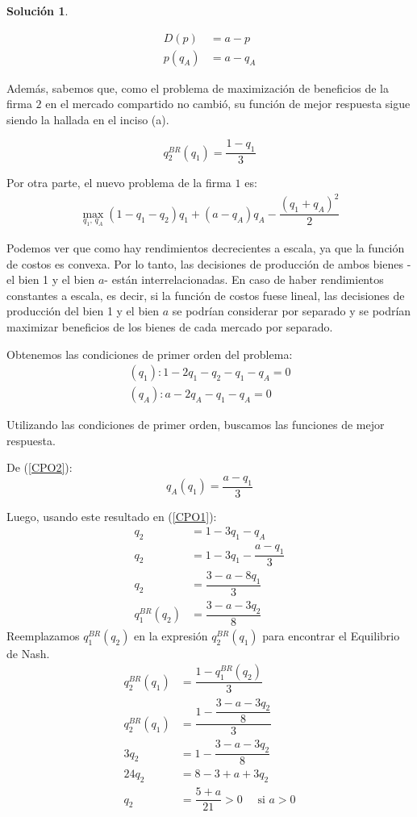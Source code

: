\documentclass[a4paper, 11pt]{article}
\theoremstyle{definition}
\newtheorem{solucion}{Soluci\'on}
\begin{document}
\begin{solucion}
\begin{enumerate}[label=(\alph*)]
\begin{enumerate}[label=\roman*.]
 \vspace*{-16pt}
 
 \begin{align*}
 D(p)&=a-p\\
 p(q_A)&=a-q_A
 \end{align*}
  
 Además, sabemos que, como el problema de maximización de beneficios de la firma $2$ en el mercado compartido no cambió, su función de mejor respuesta sigue siendo la hallada en el inciso (a).
 
 \[q_2^{BR}(q_1)=\dfrac{1-q_1}{3}\]
\vspace*{-8pt}
  
 Por otra parte, el nuevo problema de la firma $1$ es:
\begin{align*}
    \displaystyle\max_{q_1, \, q_A} (1-q_1-q_2)q_1+(a-q_A)q_A- \dfrac{(q_1+q_A)^2}{2}
\end{align*}

 Podemos ver que como hay rendimientos decrecientes a escala, ya que la función de costos es convexa. Por lo tanto, las decisiones de producción de ambos bienes -el bien 1 y el bien $a$- están interrelacionadas. En caso de haber rendimientos constantes a escala, es decir, si la función de costos fuese lineal, las decisiones de producción del bien 1 y el bien $a$ se podrían considerar por separado y se podrían maximizar beneficios de los bienes de cada mercado por separado. 
 
 \vspace{6pt}
Obtenemos las condiciones de primer orden del problema:
 \begin{align}
 (q_1): 1-2q_1-q_2-q_1-q_A=0 \label{CPO1}\\
 (q_A): a-2q_A-q_1-q_A=0 \label{CPO2}
 \end{align}
 
 \vspace*{-8pt}
 
 Utilizando las condiciones de primer orden, buscamos las funciones de mejor respuesta.
 
  De (\ref{CPO2}):
  \vspace*{-6pt}
 \[q_A(q_1)=\dfrac{a-q_1}{3}\]

 
Luego, usando este resultado en (\ref{CPO1}):
  \begin{align*}
 q_2 &=1-3q_1-q_A\\
 q_2 &=1-3q_1-\dfrac{a-q_1}{3}\\
 q_2 &=\dfrac{3-a-8q_1}{3}\\
 q_1^{BR}(q_2) &=\dfrac{3-a-3q_2}{8}
 \end{align*}
 Reemplazamos $q_1^{BR}(q_2)$ en la expresión $q_2^{BR}(q_1)$ para encontrar el Equilibrio de Nash.
 \begin{align*}
 q_2^{BR}(q_1) &=\dfrac{1-q_1^{BR}(q_2)}{3}\\
 q_2^{BR}(q_1) &=\dfrac{1-\dfrac{3-a-3q_2}{8}}{3}\\
 3q_2 &=1-\dfrac{3-a-3q_2}{8}\\
 24q_2 &=8-3+a+3q_2\\
 q_2 &=\dfrac{5+a}{21}>0 \quad \text{ si } a>0
 \end{align*}
 

\end{enumerate}
\end{enumerate}
\end{solucion}
\end{document}
